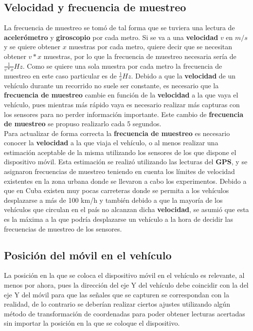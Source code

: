	\subsection{Velocidad y frecuencia de muestreo}
		La frecuencia de muestreo se tomó de tal forma que se tuviera una lectura de \textbf{acelerómetro} y \textbf
		{giroscopio} por cada metro. Si se va a una \textbf{velocidad} $v$ en $m/s$ y se quiere obtener $x$ muestras
		por cada metro, quiere decir que se necesitan obtener $v * x$ muestras, por lo que la frecuencia de muestreo
		necesaria sería de $\frac{1}{v * x} Hz$. Como se quiere una sola muestra por cada metro la frecuencia de muestreo
		en este caso particular es de $\frac{1}{v} Hz$. Debido a que la \textbf{velocidad} de un vehículo durante un
		recorrido no suele ser constante, es necesario que la \textbf{frecuencia de muestreo} cambie en función de la
		\textbf{velocidad} a la que vaya el vehículo, pues mientras más rápido vaya es necesario realizar más capturas
		con los sensores para no perder información importante. Este cambio de \textbf{frecuencia de muestreo} se propuso
		realizarlo cada 5 segundos.\\
		Para actualizar de forma correcta la \textbf{frecuencia de muestreo} es necesario conocer la \textbf{velocidad}
		a la que viaja el vehículo, o al menos realizar una estimación aceptable de la misma utilizando los sensores de
		los que dispone el dispositivo móvil. Esta estimación se realizó utilizando las lecturas del \textbf{GPS}, y se 
		asignaron frecuencias de muestreo teniendo en cuenta los límites de velocidad existentes en la zona urbana donde 
		se llevaron a cabo los experimentos. Debido a que en Cuba existen muy pocas carreteras donde se permita a
		los vehículos desplazarse a más de 100 km/h y también debido a que la mayoría de los vehículos que circulan en
		el país no alcanzan dicha \textbf{velocidad}, se asumió que esta es la máxima a la que podría desplazarse un
		vehículo a la hora de decidir las frecuencias de muestreo de los sensores.\\

	\subsection{Posición del móvil en el vehículo}
		La posición en la que se coloca el dispositivo móvil en el vehículo es relevante, al menos por ahora, pues la
		dirección del eje Y del vehículo debe coincidir con la del eje Y del móvil para que las señales que se capturen
		se correspondan con la realidad, de lo contrario se deberían realizar ciertos ajustes utilizando algún método de
		transformación de coordenadas para poder obtener lecturas acertadas sin importar la posición en la que se coloque
		el dispositivo.

